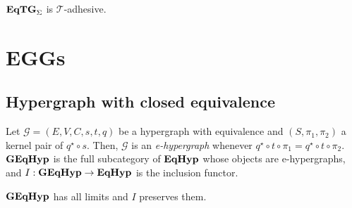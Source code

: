 \documentclass[a4paper,UKenglish,cleveref,pdftex,thm-restate,numberwithinsect]{lipics-v2021}
\newcommand{\catname}[1]{\textbf{\textup{#1}}}
\newcommand{\EqHyp}{\catname{EqHyp}} %
\newcommand{\EqTG}{\catname{EqTG}}
\newcommand{\egg}{\catname{GEqHyp}}
\begin{document}
\begin{corollary}\label{cor:tade}
	$\EqTG_{\Sigma}$ is $\mathcal{T}$-adhesive.
\end{corollary}

\section{EGGs}
\label{eggs}


\subsection{Hypergraph with closed equivalence}
\begin{definition}
	Let $\mathcal{G} = (E, V, C, s, t, q)$ be a hypergraph with equivalence and $(S, \pi_1, \pi_2)$ a kernel pair of $q^\star \circ s$.
	Then, $\mathcal{G}$ is an \emph{e-hypergraph} whenever $q^\star \circ t \circ \pi_1 = q^\star \circ t \circ \pi_2$.
	$\egg$ is the full subcategory of $\EqHyp$ whose objects are e-hypergraphs, and $I: \egg \to \EqHyp$ is the inclusion functor.
\end{definition}

\begin{lemma}
	$\egg$ has all limits and $I$ preserves them.
\end{lemma}
\end{document}
